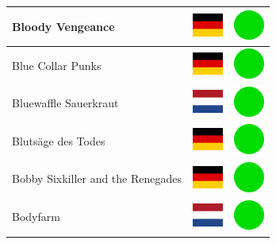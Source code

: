 \documentclass[12pt, a4paper, twoside]{report}
\begin{document}
\begin{center}
\begin{longtable}{|p{5cm}|p{2cm}|p{2cm}|}
 Bloody Vengeance                                           & \includegraphics[width=1cm]{../img/flags/de} &   \includegraphics[width=1cm]{../likes/y} \\ \hline
 Blue Collar Punks                                          & \includegraphics[width=1cm]{../img/flags/de} &   \includegraphics[width=1cm]{../likes/y} \\ \hline
 Bluewaffle Sauerkraut                                      & \includegraphics[width=1cm]{../img/flags/nl} &   \includegraphics[width=1cm]{../likes/y} \\ \hline
 Blutsäge des Todes                                         & \includegraphics[width=1cm]{../img/flags/de} &   \includegraphics[width=1cm]{../likes/y} \\ \hline
 Bobby Sixkiller and the Renegades                          & \includegraphics[width=1cm]{../img/flags/de} &   \includegraphics[width=1cm]{../likes/y} \\ \hline
 Bodyfarm                                                   & \includegraphics[width=1cm]{../img/flags/nl} &   \includegraphics[width=1cm]{../likes/y} \\ \hline

\end{longtable}
\end{center}
\end{document}
